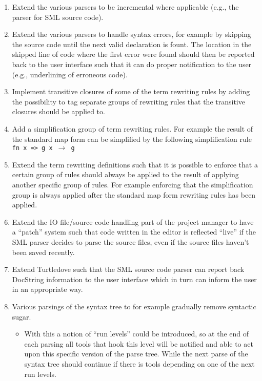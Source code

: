\documentclass[a4paper,oneside]{article}
\begin{document}
\begin{enumerate}


\item Extend the various parsers to be incremental where applicable (e.g., the
  parser for SML source code).

\item Extend the various parsers to handle syntax errors, for example by
  skipping the source code until the next valid declaration is fount.
  The location in the skipped line of code where the first error were found
  should then be reported back to the user interface such that it can do proper
  notification to the user (e.g., underlining of erroneous code).



\item Implement transitive closures of some of the term rewriting rules by
  adding the possibility to tag separate groups of rewriting rules that the
  transitive closures should be applied to.


\item Add a simplification group of term rewriting rules. For example the result
  of the standard map form can be simplified by the following simplification
  rule \texttt{ fn x => g x $\rightarrow$ g}


\item Extend the term rewriting definitions such that it is possible to enforce
  that a certain group of rules should always be applied to the result of applying
  another specific group of rules. For example enforcing that the simplification
  group is always applied after the standard map form rewriting rules has been applied.


\item Extend the IO file/source code handling part of the project manager to
  have a ``patch'' system such that code written in the editor is reflected
  ``live'' if the SML parser decides to parse the source files, even if the
  source files haven't been saved recently.


\item Extend Turtledove such that the SML source code parser can report back
  DocString information to the user interface which in turn can inform the user
  in an appropriate way.



\item Various parsings of the syntax tree to for example gradually remove
  syntactic sugar.
  \begin{itemize}

  \item With this a notion of ``run levels'' could be introduced, so at the end
    of each parsing all tools that hook this level will be notified and able to
    act upon this specific version of the parse tree. While the next parse of
    the syntax tree should continue if there is tools depending on one of the
    next run levels.

  \end{itemize}

\end{enumerate}
\end{document}
